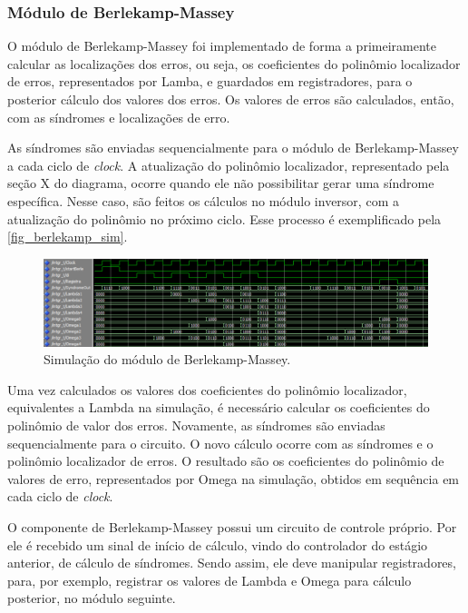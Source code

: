 	\subsubsection{Módulo de Berlekamp-Massey}
	
	O módulo de Berlekamp-Massey foi implementado de forma a primeiramente calcular as localizações dos erros, ou seja, os coeficientes do polinômio localizador de erros, representados por Lamba, e guardados em registradores, para o posterior cálculo dos valores dos erros. Os valores de erros são calculados, então, com as síndromes e localizações de erro.
	
	As síndromes são enviadas sequencialmente para o módulo de Berlekamp-Massey a cada ciclo de \textit{clock}. A atualização do polinômio localizador, representado pela seção X do diagrama, ocorre quando ele não possibilitar gerar uma síndrome específica. Nesse caso, são feitos os cálculos no módulo inversor, com a atualização do polinômio no próximo ciclo. Esse processo é exemplificado pela \autoref{fig_berlekamp_sim}.
	
	\begin{figure}[!htb]
		\caption{\label{fig_berlekamp_sim}Simulação do módulo de Berlekamp-Massey.}
		\centering
		\includegraphics[width=1\textwidth]{RS/Sim_berlekamp.PNG}
	\end{figure}
	
	Uma vez calculados os valores dos coeficientes do polinômio localizador, equivalentes a Lambda na simulação, é necessário calcular os coeficientes do polinômio de valor dos erros. Novamente, as síndromes são enviadas sequencialmente para o circuito. O novo cálculo ocorre com as síndromes e o polinômio localizador de erros. O resultado são os coeficientes do polinômio de valores de erro, representados por Omega na simulação, obtidos em sequência em cada ciclo de \textit{clock}. 
	
	O componente de Berlekamp-Massey possui um circuito de controle próprio. Por ele é recebido um sinal de início de cálculo, vindo do controlador do estágio anterior, de cálculo de síndromes. Sendo assim, ele deve manipular registradores, para, por exemplo, registrar os valores de Lambda e Omega para cálculo posterior, no módulo seguinte.
	
